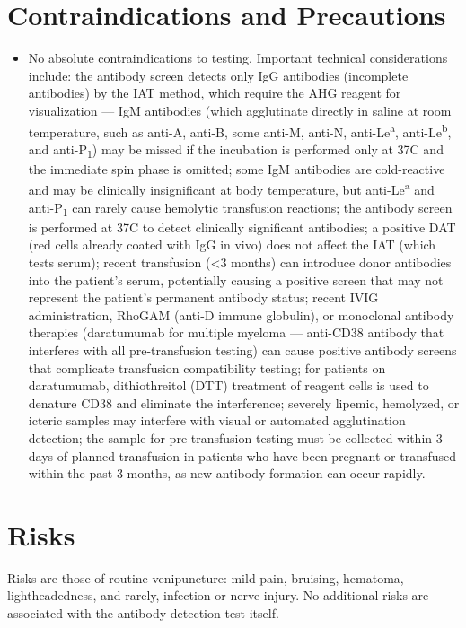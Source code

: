 \section*{Contraindications and Precautions}
\begin{itemize}
  \item No absolute contraindications to testing. Important technical considerations include: the antibody screen detects only IgG antibodies (incomplete antibodies) by the IAT method, which require the AHG reagent for visualization --- IgM antibodies (which agglutinate directly in saline at room temperature, such as anti-A, anti-B, some anti-M, anti-N, anti-Le\textsuperscript{a}, anti-Le\textsuperscript{b}, and anti-P\textsubscript{1}) may be missed if the incubation is performed only at 37\textdegree{}C and the immediate spin phase is omitted; some IgM antibodies are cold-reactive and may be clinically insignificant at body temperature, but anti-Le\textsuperscript{a} and anti-P\textsubscript{1} can rarely cause hemolytic transfusion reactions; the antibody screen is performed at 37\textdegree{}C to detect clinically significant antibodies; a positive DAT (red cells already coated with IgG in vivo) does not affect the IAT (which tests serum); recent transfusion (<3 months) can introduce donor antibodies into the patient's serum, potentially causing a positive screen that may not represent the patient's permanent antibody status; recent IVIG administration, RhoGAM (anti-D immune globulin), or monoclonal antibody therapies (daratumumab for multiple myeloma --- anti-CD38 antibody that interferes with all pre-transfusion testing) can cause positive antibody screens that complicate transfusion compatibility testing; for patients on daratumumab, dithiothreitol (DTT) treatment of reagent cells is used to denature CD38 and eliminate the interference; severely lipemic, hemolyzed, or icteric samples may interfere with visual or automated agglutination detection; the sample for pre-transfusion testing must be collected within 3 days of planned transfusion in patients who have been pregnant or transfused within the past 3 months, as new antibody formation can occur rapidly.
\end{itemize}
\section*{Risks}
Risks are those of routine venipuncture: mild pain, bruising, hematoma, lightheadedness, and rarely, infection or nerve injury. No additional risks are associated with the antibody detection test itself.

